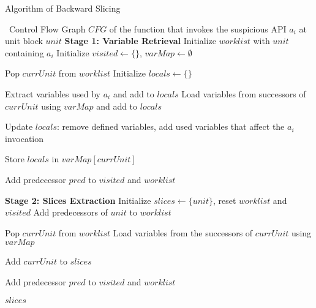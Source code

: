 \begin{algorithm}
\caption{Algorithm of Backward Slicing}
\label{alg1}
\begin{algorithmic}[1]

\REQUIRE ~Control Flow Graph $CFG$ of the function that invokes the suspicious API $a_i$ at unit block $unit$
\STATE \textbf{Stage 1: Variable Retrieval}
\STATE Initialize $worklist$ with $unit$ containing $a_i$
\STATE Initialize $visited \gets \{\}$, $varMap \gets \emptyset$

    \STATE Pop $currUnit$ from $worklist$
    \STATE Initialize $locals \gets \{\}$

        \STATE Extract variables used by $a_i$ and add to $locals$
    \ELSE
        \STATE Load variables from successors of $currUnit$ using $varMap$ and add to $locals$
    \ENDIF

        \STATE Update $locals$: remove defined variables, add used variables that affect the $a_i$ invocation
    \ENDIF

    \STATE Store $locals$ in $varMap[currUnit]$

            \STATE Add predecessor $pred$ to $visited$ and $worklist$
        \ENDIF
    \ENDFOR
\ENDWHILE

\STATE \textbf{Stage 2: Slices Extraction}
\STATE Initialize $slices \gets \{unit\}$, reset $worklist$ and $visited$
\STATE Add predecessors of $unit$ to $worklist$

    \STATE Pop $currUnit$ from $worklist$
    \STATE Load variables from the successors of $currUnit$ using $varMap$

        \STATE Add $currUnit$ to $slices$
    \ENDIF

            \STATE Add predecessor $pred$ to $visited$ and $worklist$
        \ENDIF
    \ENDFOR
\ENDWHILE

\STATE \RETURN $slices$

\end{algorithmic}
\end{algorithm}

